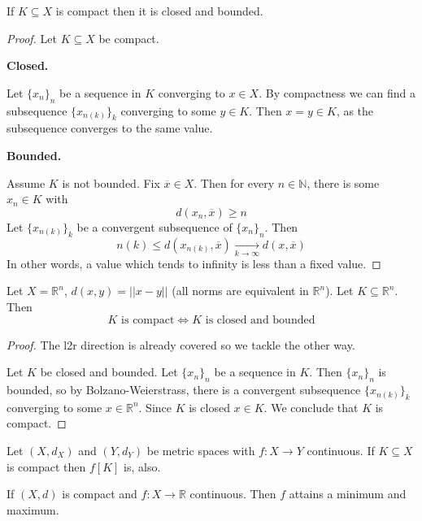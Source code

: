 \begin{thm}
    If $K \subseteq X$ is compact then it is closed and bounded. 
\end{thm}
\begin{proof}
    Let $K \subseteq X$ be compact.

    \textbf{Closed.} 

    Let $\{x_n\}_n$ be a sequence in $K$ converging to $x \in X$. 
    By compactness we can find a subsequence $\{x_{n(k)}\}_k$ 
    converging to some $y \in K$. Then $x = y \in K$, as the 
    subsequence converges to the same value. 

    \textbf{Bounded.}

    Assume $K$ is not bounded. Fix $\overline x \in X$. Then 
    for every $n \in \mathbb N$, there is some $x_n \in K$ with 
    \[
        d(x_n, \overline x) \geq n
    \]
    Let $\{x_{n(k)}\}_k$ be a convergent subsequence of $\{x_n\}_n$.
    Then 
    \[
        n(k) \leq d(x_{n(k)}, \overline x) 
        \underset{k \to \infty}{\to} d(x,\overline x)
    \]
    In other words, a value which tends to infinity is less than 
    a fixed value. 
\end{proof}
\begin{prop}
    Let $X = \mathbb R^n$, $d(x,y) = ||x-y||$ 
    (all norms are equivalent in $\mathbb R^n$). 
    Let $K \subseteq \mathbb R^n$. Then 
    \[
        K \text{ is compact}
        \Leftrightarrow 
        K \text{ is closed and bounded}
    \]
\end{prop}
\begin{proof}
    The l2r direction is already covered so we tackle the other 
    way. 

    Let $K$ be closed and bounded. Let $\{x_n\}_n$ be a sequence 
    in $K$. 
    Then $\{x_n\}_n$ is bounded, so by Bolzano-Weierstrass, there 
    is a convergent subsequence $\{x_{n(k)}\}_k$ converging to 
    some $x \in \mathbb R^n$. Since $K$ is closed $x \in K$. 
    We conclude that $K$ is compact. 
\end{proof}
\begin{thm}
    Let $(X,d_X)$ and $(Y,d_Y)$ be metric spaces with 
    $f:X\to Y$ continuous. If $K \subseteq X$ is compact then 
    $f[K]$ is, also.
\end{thm}
\begin{thm}
    If $(X,d)$ is compact and $f : X \to \mathbb R$ continuous. 
    Then $f$ attains a minimum and maximum.
\end{thm}

